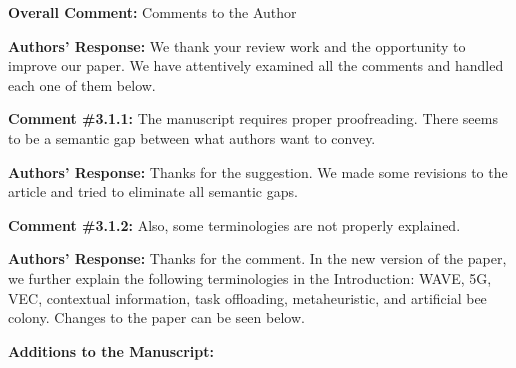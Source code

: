 \begin{center}
\end{center}

\vspace{0.5cm}

\begin{mdframed}[style=review] 
\textbf{Overall Comment:} Comments to the Author
\end{mdframed}

\textbf{Authors' Response:} We thank your review work and the opportunity to improve our paper. We have attentively examined all the comments and handled each one of them below.
\\

\begin{mdframed}[style=review] 
\textbf{Comment \#3.1.1:} The manuscript requires proper proofreading. There seems to be a semantic gap between what authors want to convey.
\end{mdframed}

\textbf{Authors' Response:} Thanks for the suggestion. We made some revisions to the article and tried to eliminate all semantic gaps.

\vspace{\baselineskip}

\begin{mdframed}[style=review] 
\textbf{Comment \#3.1.2:} Also, some terminologies are not properly explained.
\end{mdframed}

\textbf{Authors' Response:} Thanks for the comment. In the new version of the paper, we further explain the following terminologies in the Introduction: WAVE, 5G, VEC, contextual information, task offloading, metaheuristic, and artificial bee colony. Changes to the paper can be seen below.

\textbf{Additions to the Manuscript:}

